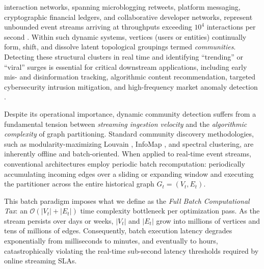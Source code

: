 \documentclass[10pt,journal,compsoc]{IEEEtran}
\begin{document}
\maketitle
\IEEEdisplaynontitleabstractindextext
\IEEEpeerreviewmaketitle


 interaction networks, spanning microblogging retweets, platform messaging, cryptographic financial ledgers, and collaborative developer networks, represent unbounded event streams arriving at throughputs exceeding $10^4$ interactions per second \cite{blondel2008fast, raghavan2007near}. Within such dynamic systems, vertices (users or entities) continually form, shift, and dissolve latent topological groupings termed \textit{communities}. Detecting these structural clusters in real time and identifying ``trending'' or ``viral'' surges is essential for critical downstream applications, including early mis- and disinformation tracking, algorithmic content recommendation, targeted cybersecurity intrusion mitigation, and high-frequency market anomaly detection \cite{newman2004finding, gupta2025sublinear}.

Despite its operational importance, dynamic community detection suffers from a fundamental tension between \textit{streaming ingestion velocity} and the \textit{algorithmic complexity} of graph partitioning. Standard community discovery methodologies, such as modularity-maximizing Louvain \cite{blondel2008fast}, InfoMap \cite{rosvall2008maps}, and spectral clustering, are inherently offline and batch-oriented. When applied to real-time event streams, conventional architectures employ periodic batch recomputation: periodically accumulating incoming edges over a sliding or expanding window and executing the partitioner across the entire historical graph $G_t = (V_t, E_t)$. 

This batch paradigm imposes what we define as the \textit{Full Batch Computational Tax}: an $\mathcal{O}(|V_t| + |E_t|)$ time complexity bottleneck per optimization pass. As the stream persists over days or weeks, $|V_t|$ and $|E_t|$ grow into millions of vertices and tens of millions of edges. Consequently, batch execution latency degrades exponentially from milliseconds to minutes, and eventually to hours, catastrophically violating the real-time sub-second latency thresholds required by online streaming SLAs.
\end{document}
